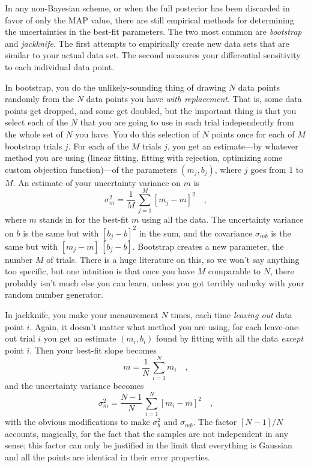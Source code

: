 \documentclass[12pt,twoside]{article}
\begin{document}
In any non-Bayesian scheme, or when the full posterior has been
discarded in favor of only the MAP value, there are still empirical
methods for determining the uncertainties in the best-fit parameters.
The two most common are \emph{bootstrap} and \emph{jackknife}.  The
first attempts to empirically create new data sets that are similar to
your actual data set.  The second measures your differential
sensitivity to each individual data point.

In bootstrap, you do the unlikely-sounding thing of drawing $N$ data
points randomly from the $N$ data points you have \emph{with
  replacement}.  That is, some data points get dropped, and some get
doubled, but the important thing is that you select each of the $N$
that you are going to use in each trial independently from the whole
set of $N$ you have.  You do this selection of $N$ points once for
each of $M$ bootstrap trials $j$.  For each of the $M$ trials $j$, you
get an estimate---by whatever method you are using (linear fitting,
fitting with rejection, optimizing some custom objection
function)---of the parameters $(m_j,b_j)$, where $j$ goes from $1$ to
$M$.  An estimate of your uncertainty variance on $m$ is
\begin{equation}
\sigma_m^2 = \frac{1}{M}\,\sum_{j=1}^M [m_j-m]^2 \quad ,
\end{equation}
where $m$ stands in for the best-fit $m$ using all the data.  The
uncertainty variance on $b$ is the same but with $[b_j-b]^2$ in the
sum, and the covariance $\sigma_{mb}$ is the same but with
$[m_j-m]\,[b_j-b]$.  Bootstrap creates a new parameter, the number $M$
of trials.  There is a huge literature on this, so we won't say
anything too specific, but one intuition is that once you have $M$
comparable to $N$, there probably isn't much else you can learn,
unless you got terribly unlucky with your random number generator.

In jackknife, you make your measurement $N$ times, each time
\emph{leaving out} data point $i$.  Again, it doesn't matter what
method you are using, for each leave-one-out trial $i$ you get an
estimate $(m_i,b_i)$ found by fitting with all the data \emph{except}
point $i$.  Then your best-fit slope becomes
\begin{equation}
m = \frac{1}{N}\,\sum_{i=1}^N m_i \quad ,
\end{equation}
and the uncertainty variance becomes
\begin{equation}
\sigma_m^2 = \frac{N-1}{N}\,\sum_{i=1}^N [m_i-m]^2 \quad ,
\end{equation}
with the obvious modifications to make $\sigma_b^2$ and $\sigma_{mb}$.
The factor $[N-1]/N$ accounts, magically, for the fact that the
samples are not independent in any sense; this factor can only be
justified in the limit that everything is Gaussian and all the points
are identical in their error properties.
\end{document}
